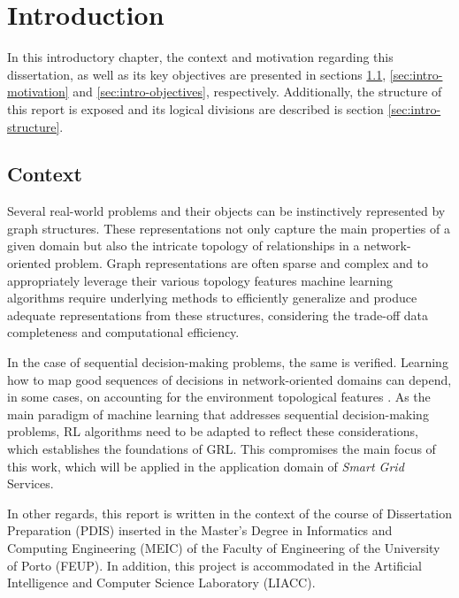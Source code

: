 
\chapter{Introduction} \label{chap:intro}

In this introductory chapter, the context and motivation regarding this dissertation, as well as its key objectives are presented in sections \ref{sec:intro-context}, \ref{sec:intro-motivation} and \ref{sec:intro-objectives}, respectively. Additionally, the structure of this report is exposed and its logical divisions are described is section \ref{sec:intro-structure}.

\section{Context} \label{sec:intro-context}

Several real-world problems and their objects can be instinctively represented by graph structures. These representations not only capture the main properties of a given domain but also the intricate topology of relationships in a network-oriented problem. Graph representations are often sparse and complex and to appropriately leverage their various topology features   machine learning algorithms require underlying methods to efficiently generalize and produce adequate representations from these structures, considering the trade-off data completeness and computational efficiency. \par
In the case of sequential decision-making problems, the same is verified. Learning how to map good sequences of decisions in network-oriented domains can depend, in some cases, on accounting for the environment topological features \cite{chenScalableGraphReinforcement2023, xingBilevelGraphReinforcement2023, xingGraphReinforcementLearningBased2023, zhaoGraphbasedDeepReinforcement2022}. As the main paradigm of machine learning that addresses sequential decision-making problems, \ac{RL} algorithms need to be adapted to reflect these considerations, which establishes the foundations of \acf{GRL}. This compromises the main focus of this work, which will be applied in the application domain of \textit{Smart Grid} Services. \par
In other regards, this report is written in the context of the course of Dissertation Preparation (PDIS) inserted in the Master's Degree in Informatics and Computing Engineering (MEIC) of the Faculty of Engineering of the University of Porto (FEUP).  In addition, this project is accommodated in the Artificial Intelligence and Computer Science Laboratory (LIACC). \par



